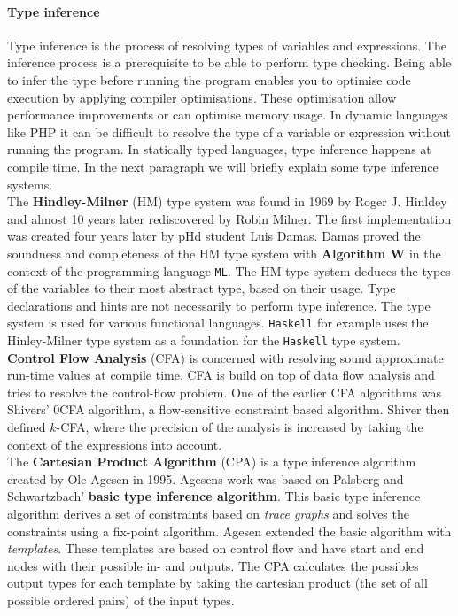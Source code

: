 \documentclass[../main.tex]{subfiles}
\begin{document}
    \paragraph{Type inference}
    Type inference is the process of resolving types of variables and expressions.
    The inference process is a prerequisite to be able to perform type checking.
    Being able to infer the type before running the program enables you to optimise code execution by applying compiler optimisations.
    These optimisation allow performance improvements or can optimise memory usage.
    In dynamic languages like PHP it can be difficult to resolve the type of a variable or expression without running the program.
    In statically typed languages, type inference happens at compile time.
    In the next paragraph we will briefly explain some type inference systems.
    \\
    The \textbf{Hindley-Milner}\cite{Hin:69} (HM) type system was found in 1969 by Roger J. Hinldey and almost 10 years later rediscovered\cite{Mil:78} by Robin Milner.
    The first implementation was created four years later by pHd student Luis Damas.
    Damas proved the soundness and completeness of the HM type system with \textbf{Algorithm W}\cite{Dam:82}  in the context of the programming language \texttt{ML}.
    The HM type system deduces the types of the variables to their most abstract type, based on their usage.
    Type declarations and hints are not necessarily to perform type inference.
    The type system is used for various functional languages. 
    \texttt{Haskell} for example uses the Hinley-Milner type system as a foundation for the \texttt{Haskell} type system. 
    \\
    \textbf{Control Flow Analysis}\cite{Nie:99} (CFA) is concerned with resolving sound approximate run-time values at compile time.
    CFA is build on top of data flow analysis\cite{Aho:86} and tries to resolve the control-flow problem.
    One of the earlier CFA algorithms was Shivers' $0$CFA algorithm\cite{Shi:88}, a flow-sensitive constraint based algorithm.
    Shiver then defined $k$-CFA\cite{Shi:91}, where the precision of the analysis is increased by taking the context of the expressions into account.
	\\
    The \textbf{Cartesian Product Algorithm}\cite{Age:95} (CPA) is a type inference algorithm created by Ole Agesen in 1995.
    Agesens work was based on Palsberg and Schwartzbach' \textbf{basic type inference algorithm}\cite{Pal:91}.
    This basic type inference algorithm derives a set of constraints based on \textit{trace graphs} and solves the constraints using a fix-point algorithm.
    Agesen extended the basic algorithm with \textit{templates}.
    These templates are based on control flow and have start and end nodes with their possible in- and outputs.
    The CPA calculates the possibles output types for each template by taking the cartesian product (the set of all possible ordered pairs) of the input types.
\end{document}
